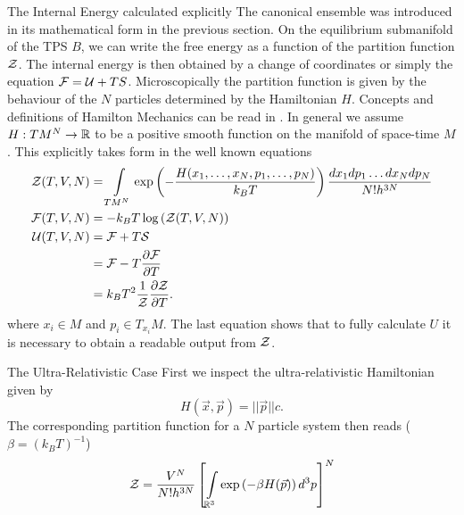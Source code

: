 \begin{section}{The Internal Energy calculated explicitly}
The canonical ensemble was introduced in its mathematical form in the previous section. On the equilibrium submanifold of the TPS $B$, we can write the free energy as a function of the partition function $\mathcal{Z}$. The internal energy is then obtained by a change of coordinates or simply the equation $\mathcal{F}=\mathcal{U}+TS$. Microscopically the partition function is given by the behaviour of the $N$ particles determined by the Hamiltonian $H$. Concepts and definitions of Hamilton Mechanics can be read in \cite{eschrigTopologyGeometryPhysics2011, grosseAllgemeineRelativitaetstheorie2019, choquet-bruhatGeneralRelativityEinstein2009, choquet-bruhatIntroductionGeneralRelativity2015, choquet-bruhatAnalysisManifoldsPhysics2000, spivakPhysicsMathematiciansMechanics2010}. In general we assume $H:TM^N\rightarrow\mathbb{R}$ to be a positive smooth function on the manifold of space-time $M$. This explicitly takes form in the well known equations
\begin{align}
	\mathcal{Z}(T,V,N) 	&= \int\limits_{TM^N}\exp\left(-\frac{H(x_1,\dots,x_N,p_1,\dots,p_N)}{k_BT}\right)\frac{dx_1dp_1\dots dx_Ndp_N}{N!h^{3N}}\\
	\mathcal{F}(T,V,N) 	&= - k_BT\log\left(\mathcal{Z}(T,V,N)\right)\label{2-IntEner-FreeEnerDef}\\
	\mathcal{U}(T,V,N) 	&= \mathcal{F} + T \mathcal{S}\\
				&= \mathcal{F} - T\frac{\partial\mathcal{F}}{\partial T}\\
				&= k_BT^2\frac{1}{\mathcal{Z}}\frac{\partial\mathcal{Z}}{\partial T}\label{2-IntEner-Def}.
\end{align}
where $x_i\in M$ and $p_i\in T_{x_i}M$. The last equation shows that to fully calculate $U$ it is necessary to obtain a readable output from $\mathcal{Z}$.
\begin{subsection}{The Ultra-Relativistic Case}
First we inspect the ultra-relativistic Hamiltonian given by 
\begin{equation}
	H(\vec{x},\vec{p})=||\vec{p}||c.
\end{equation}
The corresponding partition function for a $N$ particle system then reads ($\beta=(k_BT)^{-1}$)
\begin{align}
	\Z 	&= \frac{V^N}{N!h^{3N}}\left[\int\limits_{\R^3}\exp\left(- \beta H(\vec{p})\right)d^3p\right]^N\\

\end{align}
\end{subsection}
\end{section}

